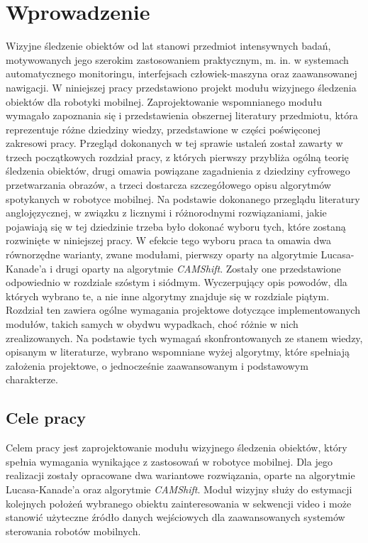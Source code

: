 \chapter{Wprowadzenie}
\label{cha:Wprowadzenie}

Wizyjne śledzenie obiektów od lat stanowi przedmiot intensywnych badań, motywowanych jego szerokim zastosowaniem praktycznym, m. in. w systemach automatycznego monitoringu, interfejsach człowiek-maszyna oraz zaawansowanej nawigacji. W niniejszej pracy przedstawiono projekt modułu wizyjnego śledzenia obiektów dla robotyki mobilnej. Zaprojektowanie wspomnianego modułu wymagało zapoznania się i przedstawienia obszernej literatury przedmiotu, która reprezentuje różne dziedziny wiedzy, przedstawione w części poświęconej zakresowi pracy. Przegląd dokonanych w tej sprawie ustaleń został zawarty w trzech początkowych rozdział pracy, z których pierwszy przybliża ogólną teorię śledzenia obiektów, drugi omawia powiązane zagadnienia z dziedziny cyfrowego przetwarzania obrazów, a trzeci dostarcza szczegółowego opisu algorytmów spotykanych w robotyce mobilnej. Na podstawie dokonanego przeglądu literatury anglojęzycznej, w związku z licznymi i różnorodnymi rozwiązaniami, jakie pojawiają się w tej dziedzinie trzeba było dokonać wyboru tych, które zostaną rozwinięte w niniejszej pracy. W efekcie tego wyboru praca ta omawia dwa równorzędne warianty, zwane modułami, pierwszy oparty na algorytmie Lucasa-Kanade'a i drugi oparty na algorytmie \textit{CAMShift}. Zostały one przedstawione odpowiednio w rozdziale szóstym i siódmym. Wyczerpujący opis powodów, dla których wybrano te, a nie inne algorytmy znajduje się w rozdziale piątym. Rozdział ten zawiera ogólne wymagania projektowe dotyczące implementowanych modułów, takich samych w obydwu wypadkach, choć różnie w nich zrealizowanych. Na podstawie tych wymagań skonfrontowanych ze stanem wiedzy, opisanym w literaturze, wybrano wspomniane wyżej algorytmy, które spełniają założenia projektowe, o jednocześnie zaawansowanym i podstawowym charakterze.

\section{Cele pracy}
\label{sec:Cele_pracy}

Celem pracy jest zaprojektowanie modułu wizyjnego śledzenia obiektów, który spełnia wymagania wynikające z zastosowań w robotyce mobilnej. Dla jego realizacji zostały opracowane dwa wariantowe rozwiązania, oparte na algorytmie Lucasa-Kanade'a oraz algorytmie \textit{CAMShift}. Moduł wizyjny służy do estymacji kolejnych położeń wybranego obiektu zainteresowania w sekwencji video i może stanowić użyteczne źródło danych wejściowych dla zaawansowanych systemów sterowania robotów mobilnych. 

